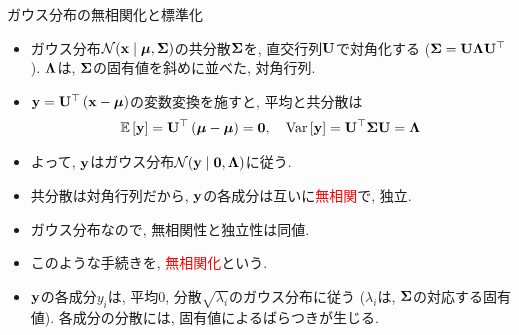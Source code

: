 \documentclass[dvipdfmx,notheorems,t]{beamer}
\begin{document}
\begin{frame}{ガウス分布の無相関化と標準化}
\begin{itemize}
  \item ガウス分布$\mathcal{N}(\vb{x} \mid \vb*{\mu}, \vb{\Sigma})$の共分散$\vb{\Sigma}$を, 直交行列$\vb{U}$で対角化する
  ($\vb{\Sigma} = \vb{U} \vb{\Lambda} \vb{U}^\top$).
  $\vb{\Lambda}$は, $\vb{\Sigma}$の固有値を斜めに並べた, 対角行列.
  \item $\vb{y} = \vb{U}^\top \left( \vb{x} - \vb*{\mu} \right)$の変数変換を施すと,
  平均と共分散は
  \begin{align*}
    \operatorname{\mathbb{E}} \left[ \vb{y} \right] = \vb{U}^\top \left( \vb*{\mu} - \vb*{\mu} \right) = \vb{0}, \quad
    \operatorname{Var} \left[ \vb{y} \right] = \vb{U}^\top \vb{\Sigma} \vb{U} = \vb{\Lambda}
  \end{align*}
  \item よって, $\vb{y}$はガウス分布$\mathcal{N}(\vb{y} \mid \vb{0}, \vb{\Lambda})$に従う.
  \item 共分散は対角行列だから, $\vb{y}$の各成分は互いに\textcolor{red}{無相関}で, 独立.
  \item ガウス分布なので, 無相関性と独立性は同値.
  \item このような手続きを, \textcolor{red}{無相関化}という.
  \item $\vb{y}$の各成分$y_i$は, 平均0, 分散$\sqrt{\lambda_i}$のガウス分布に従う
  ($\lambda_i$は, $\vb{\Sigma}$の対応する固有値).
  各成分の分散には, 固有値によるばらつきが生じる.
\end{itemize}
\end{frame}
\end{document}
